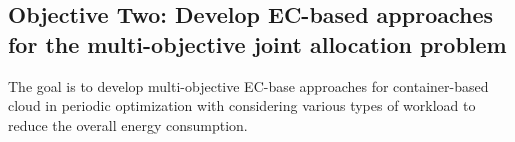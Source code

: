 \subsection{Objective Two: Develop EC-based approaches for the multi-objective joint allocation problem}
The goal is to develop multi-objective EC-base approaches for container-based cloud in periodic optimization with considering various types of workload to reduce the overall energy consumption.


